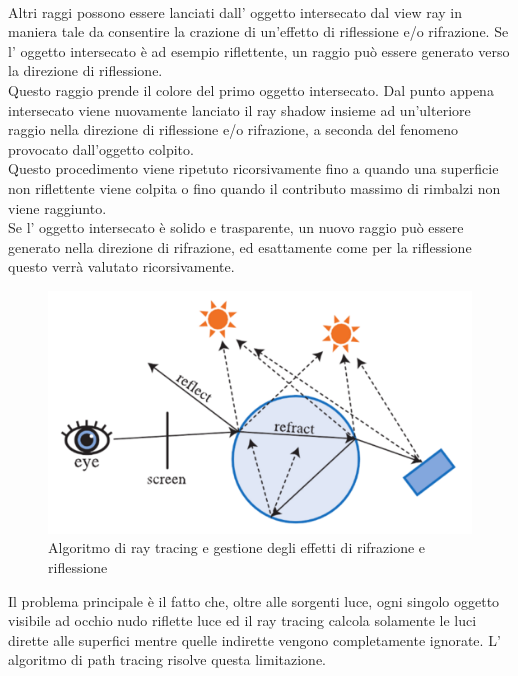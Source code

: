 \\
Altri raggi possono essere lanciati dall’ oggetto intersecato dal view ray in maniera tale da consentire la crazione di un’effetto di riflessione e/o rifrazione.
Se l’ oggetto intersecato è ad esempio riflettente, un raggio può essere generato verso la direzione di riflessione.
\\
Questo raggio prende il colore del primo oggetto intersecato. Dal punto appena intersecato viene nuovamente lanciato il ray shadow insieme ad un’ulteriore raggio nella direzione di riflessione e/o rifrazione, a seconda del fenomeno provocato dall’oggetto colpito. 
\\Questo procedimento viene ripetuto ricorsivamente fino a quando una superficie non riflettente viene colpita o fino quando il contributo massimo di rimbalzi non viene raggiunto.
\\
Se l’ oggetto intersecato è solido e trasparente, un nuovo raggio può essere generato nella direzione di rifrazione, ed esattamente come per la riflessione questo verrà valutato ricorsivamente.
\newpage
\begin{figure}[htb]
 \centering
 \includegraphics[width=0.7\linewidth]{images/chapter_stato_arte/stato_arte_refr_refl.png}\hfill
 \caption[Ray tracing ed effetti di rifrazione/riflessione]{Algoritmo di ray tracing e gestione degli effetti di rifrazione e riflessione}
 \label{fig:stato_arte_refr_refl}
\end{figure}

Il problema principale è il fatto che, oltre alle sorgenti luce, ogni singolo oggetto visibile ad occhio nudo riflette luce ed il 
ray tracing calcola solamente le luci dirette alle superfici mentre quelle indirette vengono completamente ignorate. L’ algoritmo di path tracing risolve questa limitazione.